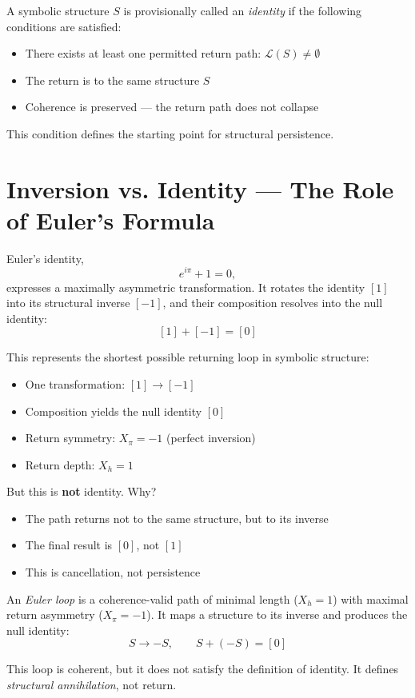 \begin{definition}[Identity] \label{def:identity}
A symbolic structure $S$ is provisionally called an \textit{identity} if the following conditions are satisfied:
\begin{itemize}
  \item There exists at least one permitted return path: $\mathcal{L}(S) \neq \emptyset$
  \item The return is to the same structure $S$
  \item Coherence is preserved — the return path does not collapse
\end{itemize}

This condition defines the starting point for structural persistence.
\end{definition}

\section{Inversion vs. Identity — The Role of Euler’s Formula} \label{inversion-vs-identity-the-role-of-eulers-formula}

Euler's identity,
\[
e^{i\pi} + 1 = 0,
\]
expresses a maximally asymmetric transformation. It rotates the identity $[1]$ into its structural inverse $[-1]$, and their composition resolves into the null identity:
\[
[1] + [-1] = [0]
\]

This represents the shortest possible returning loop in symbolic structure:
\begin{itemize}
  \item One transformation: $[1] \rightarrow [-1]$
  \item Composition yields the null identity $[0]$
  \item Return symmetry: $X_\pi = -1$ (perfect inversion)
  \item Return depth: $X_h = 1$
\end{itemize}

But this is \textbf{not} identity. Why?

\begin{itemize}
  \item The path returns not to the same structure, but to its inverse
  \item The final result is $[0]$, not $[1]$
  \item This is cancellation, not persistence
\end{itemize}

\begin{definition} \label{def:euler-inversion-loop}
An \textit{Euler loop} is a coherence-valid path of minimal length ($X_h = 1$) with maximal return asymmetry ($X_\pi = -1$).  
It maps a structure to its inverse and produces the null identity:
\begin{equation} \label{eq:euler-cancellation}
S \rightarrow -S, \qquad S + (-S) = [0]
\end{equation}

This loop is coherent, but it does not satisfy the definition of identity.  
It defines \textit{structural annihilation}, not return.
\end{definition}

